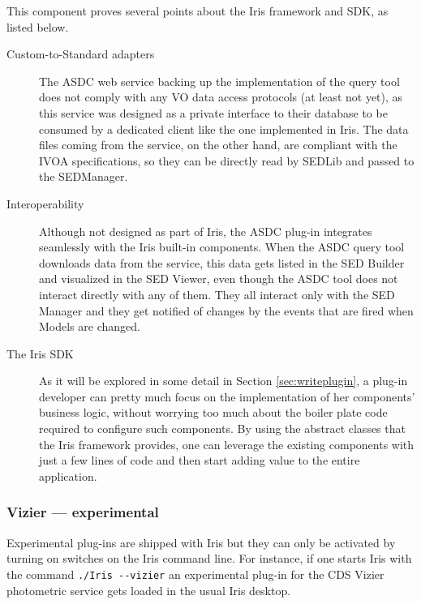 \documentclass[final,5p,authoryear]{elsarticle}
\begin{document}
This component proves several points about the Iris framework and SDK, as listed below.
\begin{description} \item[Custom-to-Standard adapters] The ASDC web service
backing up the implementation of the query tool does not comply with any VO data
access protocols (at least not yet), as this service was designed as a private interface
to their database to be consumed by a dedicated client like the one implemented in
Iris. The data files coming from the service, on the other hand, are compliant
with the IVOA specifications, so they can be directly read by SEDLib and passed
to the SEDManager.  \item[Interoperability] Although not
designed as part of Iris, the ASDC plug-in integrates seamlessly with the Iris built-in
components. When the ASDC query tool downloads data from the service, this data
gets listed in the SED Builder and visualized in the SED Viewer, even though the
ASDC tool
does not interact directly with any of them. They all interact only with the SED
Manager and they get notified of changes by the events that are fired when
Models are changed.  \item[The Iris SDK] As it will be explored in some detail
in Section \ref{sec:writeplugin}, a plug-in developer can pretty much focus on
the implementation of her components' business logic, without worrying too much
about the boiler plate code required to configure such components. By using the
abstract classes that the Iris framework provides, one can leverage the existing
components with just a few lines of code and then start adding value to the
entire application.  \end{description}

\subsubsection{Vizier --- experimental} \label{sec:asdc} Experimental plug-ins
are shipped with Iris but they can only be activated by turning on switches on
the Iris command line. For instance, if one starts Iris with the command
\verb|./Iris --vizier| an experimental plug-in for the CDS Vizier photometric
service gets loaded in the usual Iris desktop.


\end{document}
